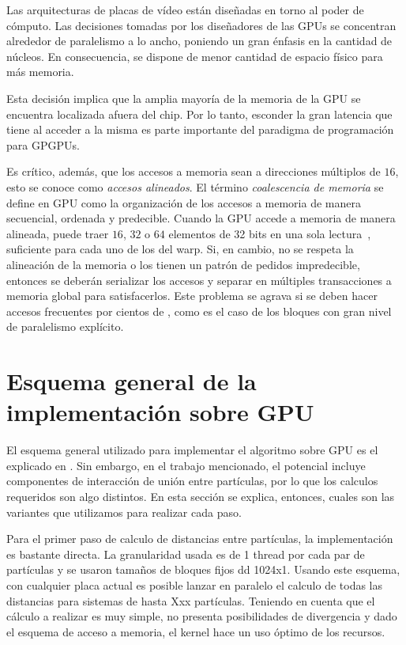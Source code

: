 Las arquitecturas de placas de v\'ideo est\'an dise\~nadas en torno al poder de c\'omputo.
Las decisiones tomadas por los dise\~nadores de las GPUs se concentran alrededor de paralelismo a lo ancho, poniendo un gran \'enfasis en la cantidad de n\'ucleos.
En consecuencia, se dispone de menor cantidad de espacio f\'isico para m\'as memoria.

Esta decisi\'on implica que la amplia mayor\'ia de la memoria de la GPU se encuentra localizada afuera del chip.
Por lo tanto, esconder la gran latencia que tiene al acceder a la misma es parte importante del paradigma de programaci\'on para GPGPUs.

Es cr\'itico, adem\'as, que los accesos a memoria sean a direcciones m\'ultiplos de $16$, esto se conoce como \textit{accesos alineados}.
El t\'ermino \emph{coalescencia de memoria} se define en GPU como la organizaci\'on de los accesos a memoria de manera secuencial, ordenada y predecible.
Cuando la GPU accede a memoria de manera alineada, puede traer $16$, $32$ o $64$ elementos de 32 bits en una sola lectura~\cite{cudaProgrammingGuide}, suficiente para cada uno de los \threads{} del warp.
Si, en cambio, no se respeta la alineaci\'on de la memoria o los \threads{} tienen un patr\'on de pedidos impredecible, entonces se deber\'an serializar los accesos y separar en m\'ultiples transacciones a memoria global para satisfacerlos.
Este problema se agrava si se deben hacer accesos frecuentes por cientos de \threads{}, como es el caso de los bloques con gran nivel de paralelismo expl\'icito.


\section{Esquema general de la implementación sobre GPU}
El esquema general utilizado para implementar el algoritmo sobre GPU es el explicado en \cite{friedrichs2009accelerating}. Sin embargo, en el trabajo mencionado, el potencial incluye componentes de interacción de unión entre partículas, 
por lo que los calculos requeridos son algo distintos. En esta sección se explica, entonces, cuales son las variantes que utilizamos para realizar cada paso.

Para el primer paso de calculo de distancias entre partículas, la implementación es bastante directa. La granularidad usada es de 1 thread por cada par de partículas y se usaron tamaños de bloques fijos dd 1024x1.
Usando este esquema, con cualquier placa actual es posible lanzar en paralelo el calculo de todas las distancias para sistemas de hasta Xxx partículas. Teniendo en cuenta  que  el cálculo a realizar es muy simple, no presenta posibilidades de divergencia y dado el esquema de acceso a memoria, el kernel hace un uso óptimo de los recursos.

